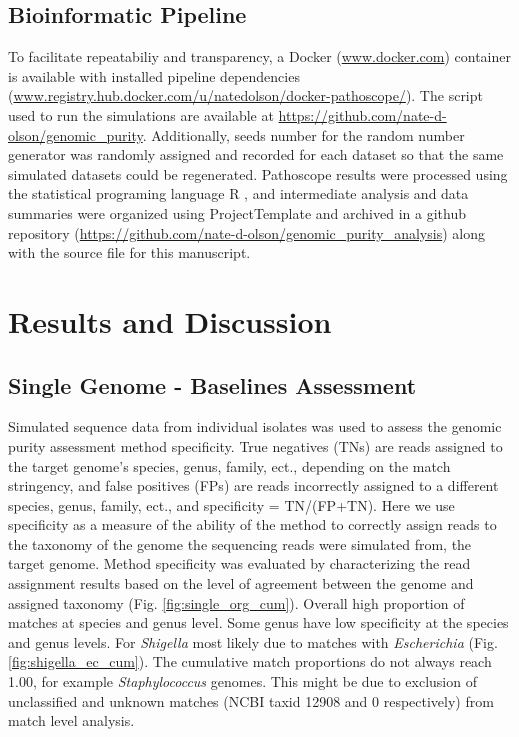 \documentclass[fleqn,10pt,lineno]{wlpeerj}\usepackage[]{graphicx}\usepackage[]{color}
\begin{document}
\subsection*{Bioinformatic Pipeline}
To facilitate repeatabiliy and transparency, a Docker (\url{www.docker.com}) container is available with installed pipeline dependencies (\url{www.registry.hub.docker.com/u/natedolson/docker-pathoscope/}). 
The script used to run the simulations are available at \url{https://github.com/nate-d-olson/genomic_purity}. 
Additionally, seeds number for the random number generator was randomly assigned and recorded for each dataset so that the same simulated datasets could be regenerated.
Pathoscope results were processed using the statistical programing language R \citep{R}, and intermediate analysis and data summaries were organized using ProjectTemplate \citep{ProjectTemplate} and archived in a github repository (\url{https://github.com/nate-d-olson/genomic_purity_analysis}) along with the source file for this manuscript.

\section*{Results and Discussion}

\subsection*{Single Genome - Baselines Assessment}

Simulated sequence data from individual isolates was used to assess the genomic purity assessment method specificity. 
True negatives (TNs) are reads assigned to the target genome's species, genus, family, ect., depending on the match stringency, and false positives (FPs) are reads incorrectly assigned to a different species, genus, family, ect., and specificity = TN/(FP+TN). 
Here we use specificity as a measure of the ability of the method to correctly assign reads to the taxonomy of the genome the sequencing reads were simulated from, the target genome. 
Method specificity was evaluated by characterizing the read assignment results based on the level of agreement between the genome and assigned taxonomy (Fig. \ref{fig:single_org_cum}). 
Overall high proportion of matches at species and genus level. 
Some genus have low specificity at the species and genus levels.  
For \textit{Shigella} most likely due to matches with \textit{Escherichia} (Fig. \ref{fig:shigella_ec_cum}). 
The cumulative match proportions do not always reach 1.00, for example \textit{Staphylococcus} genomes. 
This might be due to exclusion of unclassified and unknown matches (NCBI taxid 12908 and 0 respectively) from match level analysis.
\end{document}
